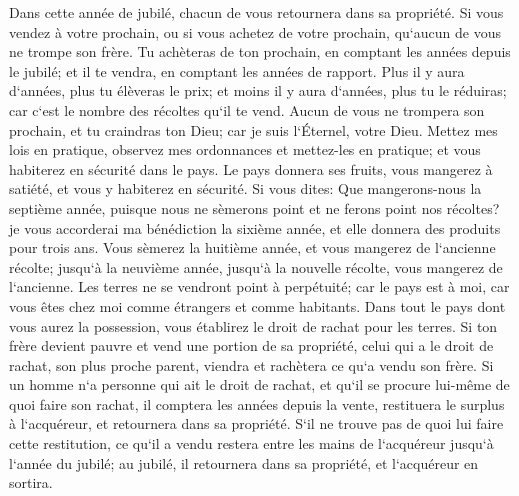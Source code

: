 \verse Dans cette année de jubilé, chacun de vous retournera dans sa propriété. 
\verse Si vous vendez à votre prochain, ou si vous achetez de votre prochain, qu`aucun de vous ne trompe son frère. 
\verse Tu achèteras de ton prochain, en comptant les années depuis le jubilé; et il te vendra, en comptant les années de rapport. 
\verse Plus il y aura d`années, plus tu élèveras le prix; et moins il y aura d`années, plus tu le réduiras; car c`est le nombre des récoltes qu`il te vend. 
\verse Aucun de vous ne trompera son prochain, et tu craindras ton Dieu; car je suis l`Éternel, votre Dieu. 
\verse Mettez mes lois en pratique, observez mes ordonnances et mettez-les en pratique; et vous habiterez en sécurité dans le pays. 
\verse Le pays donnera ses fruits, vous mangerez à satiété, et vous y habiterez en sécurité. 
\verse Si vous dites: Que mangerons-nous la septième année, puisque nous ne sèmerons point et ne ferons point nos récoltes? 
\verse je vous accorderai ma bénédiction la sixième année, et elle donnera des produits pour trois ans. 
\verse Vous sèmerez la huitième année, et vous mangerez de l`ancienne récolte; jusqu`à la neuvième année, jusqu`à la nouvelle récolte, vous mangerez de l`ancienne. 
\verse Les terres ne se vendront point à perpétuité; car le pays est à moi, car vous êtes chez moi comme étrangers et comme habitants. 
\verse Dans tout le pays dont vous aurez la possession, vous établirez le droit de rachat pour les terres. 
\verse Si ton frère devient pauvre et vend une portion de sa propriété, celui qui a le droit de rachat, son plus proche parent, viendra et rachètera ce qu`a vendu son frère. 
\verse Si un homme n`a personne qui ait le droit de rachat, et qu`il se procure lui-même de quoi faire son rachat, 
\verse il comptera les années depuis la vente, restituera le surplus à l`acquéreur, et retournera dans sa propriété. 
\verse S`il ne trouve pas de quoi lui faire cette restitution, ce qu`il a vendu restera entre les mains de l`acquéreur jusqu`à l`année du jubilé; au jubilé, il retournera dans sa propriété, et l`acquéreur en sortira. 
